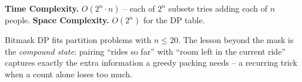 \begin{complexitybox}
\textbf{Time Complexity.} $O(2^n\cdot n)$ -- each of $2^n$ subsets tries
adding each of $n$ people. \textbf{Space Complexity.} $O(2^n)$ for the DP
table.
\end{complexitybox}

\begin{takeawaybox}
Bitmask DP fits partition problems with $n\le20$. The lesson beyond the
mask is the \emph{compound state}: pairing ``rides so far'' with ``room
left in the current ride'' captures exactly the extra information a greedy
packing needs -- a recurring trick when a count alone loses too much.
\end{takeawaybox}
